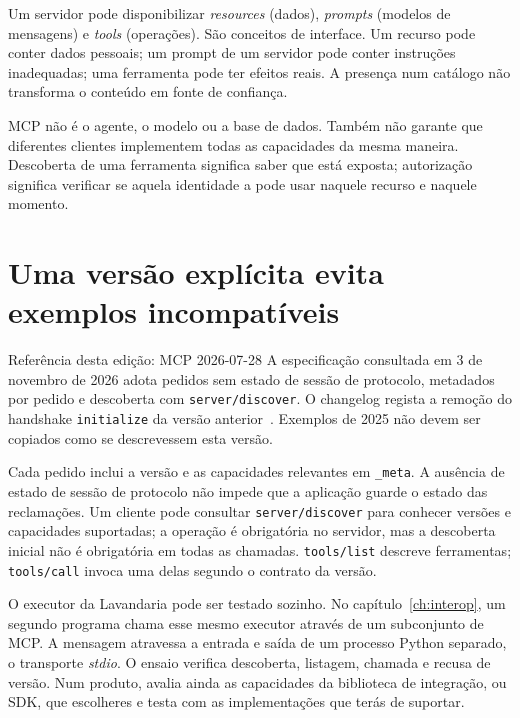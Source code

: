 Um servidor pode disponibilizar \emph{resources} (dados), \emph{prompts} (modelos de mensagens) e \emph{tools} (operações). São conceitos de interface. Um recurso pode conter dados pessoais; um prompt de um servidor pode conter instruções inadequadas; uma ferramenta pode ter efeitos reais. A presença num catálogo não transforma o conteúdo em fonte de confiança.

MCP não é o agente, o modelo ou a base de dados. Também não garante que diferentes clientes implementem todas as capacidades da mesma maneira. Descoberta de uma ferramenta significa saber que está exposta; autorização significa verificar se aquela identidade a pode usar naquele recurso e naquele momento.

\section{Uma versão explícita evita exemplos incompatíveis}
\begin{warningboxenv}{Referência desta edição: MCP 2026-07-28}
A especificação consultada em 3 de novembro de 2026 adota pedidos sem estado de sessão de protocolo, metadados por pedido e descoberta com \texttt{server/discover}. O changelog regista a remoção do handshake \texttt{initialize} da versão anterior~\citep{mcpchanges2026}. Exemplos de 2025 não devem ser copiados como se descrevessem esta versão.
\end{warningboxenv}

Cada pedido inclui a versão e as capacidades relevantes em \texttt{\_meta}. A ausência de estado de sessão de protocolo não impede que a aplicação guarde o estado das reclamações. Um cliente pode consultar \texttt{server/discover} para conhecer versões e capacidades suportadas; a operação é obrigatória no servidor, mas a descoberta inicial não é obrigatória em todas as chamadas. \texttt{tools/list} descreve ferramentas; \texttt{tools/call} invoca uma delas segundo o contrato da versão.

O executor da Lavandaria pode ser testado sozinho. No capítulo~\ref{ch:interop}, um segundo programa chama esse mesmo executor através de um subconjunto de MCP. A mensagem atravessa a entrada e saída de um processo Python separado, o transporte \emph{stdio}. O ensaio verifica descoberta, listagem, chamada e recusa de versão. Num produto, avalia ainda as capacidades da biblioteca de integração, ou SDK, que escolheres e testa com as implementações que terás de suportar.

